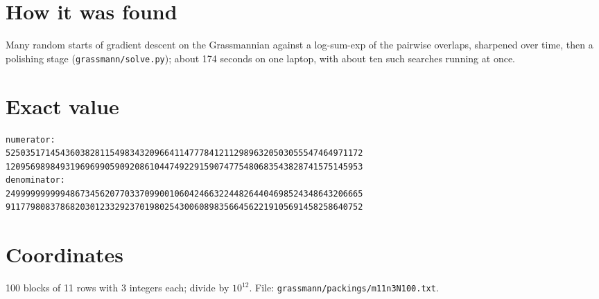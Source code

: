 \documentclass[11pt,a4paper]{article}
\begin{document}
\section{How it was found}
Many random starts of gradient descent on the Grassmannian against a log-sum-exp of the pairwise overlaps, sharpened over time, then a polishing stage (\texttt{grassmann/solve.py}); about 174 seconds on one laptop, with about ten such searches running at once.


\appendix
\section{Exact value}
{\small
\begin{verbatim}
numerator:
525035171454360382811549834320966411477784121129896320503055547464971172
120956989849319696990590920861044749229159074775480683543828741575145953
denominator:
249999999999486734562077033709900106042466322448264404698524348643206665
911779808378682030123329237019802543006089835664562219105691458258640752
\end{verbatim}}

\section{Coordinates}
100 blocks of 11 rows with 3 integers each; divide by $10^{12}$. File: \texttt{grassmann/packings/m11n3N100.txt}.
{\tiny
\begin{multicols}{3}
\end{multicols}}
\end{document}
